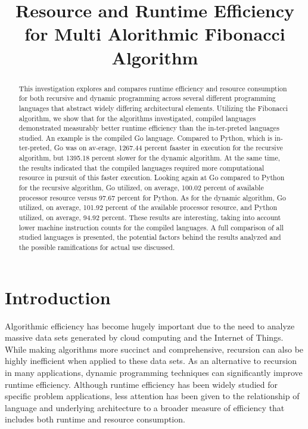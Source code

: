 \documentclass{sig-alternate}
\title{Resource and Runtime Efficiency for Multi Alorithmic Fibonacci Algorithm}
\author{}
\begin{document}
\maketitle
\thispagestyle{firstpage}
\pagestyle{plain}




\begin{abstract}

This investigation explores and compares runtime efficiency and resource consumption 
for both recursive and dynamic programming across several different programming languages that abstract widely differing architectural elements. Utilizing the Fibonacci algorithm, we show that for the algorithms investigated, compiled languages demonstrated measurably better runtime efficiency than the in-ter-preted languages studied. An example is the compiled Go language. Compared to Python, which is in-ter-preted, Go was on av-erage, 1267.44 percent faaster in execution for the recursive algorithm, but 1395.18 percent slower for the dynamic algorithm. At the same time, the results indicated that the compiled languages required more computational resource in pursuit of this faster execution. Looking again at Go compared to Python for the recursive algorithm, Go utilized, on average, 100.02 percent of available processor resource versus 97.67 percent for Python. As for the dynamic algorithm, Go utilized, on average, 101.92 percent of the available processor resource, and Python utilized, on average, 94.92 percent. These results are interesting, taking into account lower machine instruction counts for the compiled languages. A full comparison of all studied languages is presented, the potential factors behind the results analyzed and the possible ramifications for actual use discussed.

\end{abstract}

\section{Introduction}
Algorithmic efficiency has become hugely important due to the need to analyze massive data sets generated by cloud computing and the Internet of Things. While making algorithms more succinct and comprehensive, recursion can also be highly inefficient when applied to these data sets. As an alternative to recursion in many applications, dynamic programming techniques can significantly improve runtime efficiency. Although runtime efficiency has been widely studied for specific problem applications, less attention has been given to the relationship of language and underlying architecture to a broader measure of efficiency that includes both runtime and resource consumption.
\end{document}
